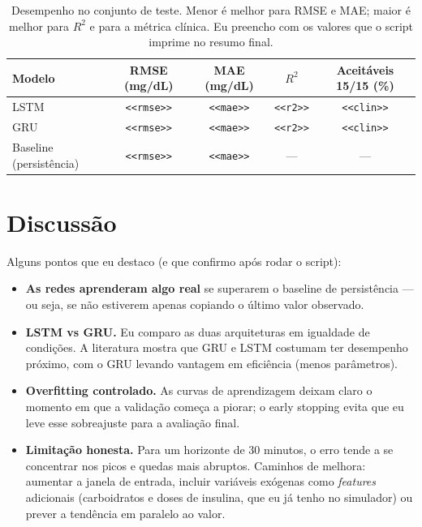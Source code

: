\documentclass[11pt,a4paper]{article}
\newcommand{\preencher}[1]{{\color{red}\texttt{<<#1>>}}}
\begin{document}
\begin{table}[H]
  \centering
  \caption{Desempenho no conjunto de teste. Menor é melhor para RMSE e MAE;
  maior é melhor para $R^2$ e para a métrica clínica. Eu preencho com os
  valores que o script imprime no resumo final.}
  \label{tab:metricas}
  \begin{tabular}{lcccc}
    \toprule
    Modelo & RMSE (mg/dL) & MAE (mg/dL) & $R^2$ & Aceitáveis 15/15 (\%) \\
    \midrule
    LSTM     & \preencher{rmse} & \preencher{mae} & \preencher{r2} & \preencher{clin} \\
    GRU      & \preencher{rmse} & \preencher{mae} & \preencher{r2} & \preencher{clin} \\
    \midrule
    Baseline (persistência) & \preencher{rmse} & \preencher{mae} & --- & --- \\
    \bottomrule
  \end{tabular}
\end{table}

\section{Discussão}

Alguns pontos que eu destaco (e que confirmo após rodar o script):

\begin{itemize}
  \item \textbf{As redes aprenderam algo real} se superarem o baseline de
        persistência --- ou seja, se não estiverem apenas copiando o último
        valor observado.

  \item \textbf{LSTM vs GRU.} Eu comparo as duas arquiteturas em igualdade de
        condições. A literatura mostra que GRU e LSTM costumam ter desempenho
        próximo, com o GRU levando vantagem em eficiência (menos parâmetros).

  \item \textbf{Overfitting controlado.} As curvas de aprendizagem deixam claro
        o momento em que a validação começa a piorar; o early stopping evita
        que eu leve esse sobreajuste para a avaliação final.

  \item \textbf{Limitação honesta.} Para um horizonte de 30 minutos, o erro
        tende a se concentrar nos picos e quedas mais abruptos. Caminhos de
        melhora: aumentar a janela de entrada, incluir variáveis exógenas como
        \emph{features} adicionais (carboidratos e doses de insulina, que eu já
        tenho no simulador) ou prever a tendência em paralelo ao valor.
\end{itemize}
\end{document}
